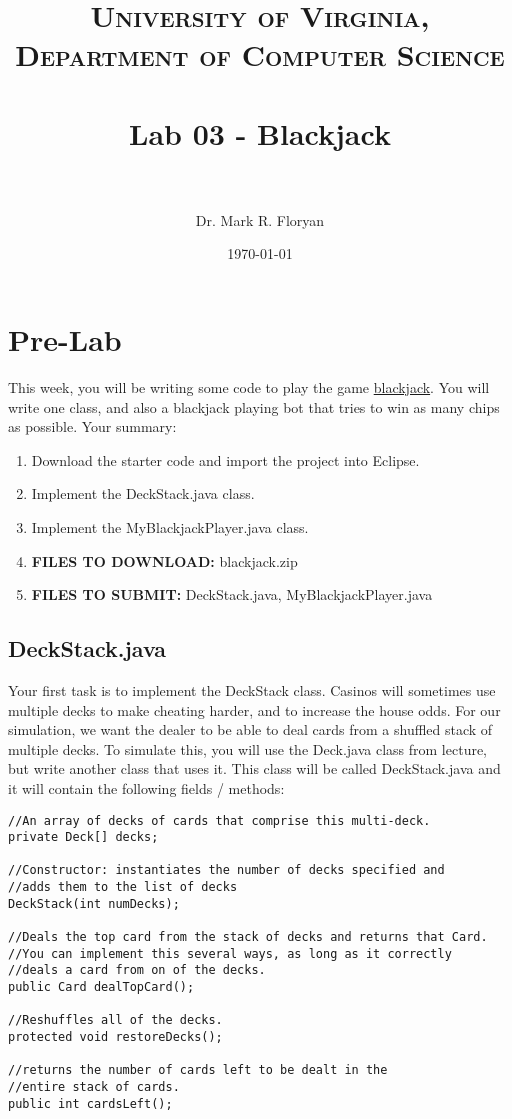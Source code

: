 \documentclass[paper=a4, fontsize=11pt, parskip=full]{scrartcl} %
\title{	
\normalfont \normalsize 
\textsc{University of Virginia, Department of Computer Science} \\ [25pt] %
\horrule{0.5pt} \\[0.4cm] %
\huge Lab 03 - Blackjack \\ %
\horrule{2pt} \\[0.5cm] %
}
\author{Dr. Mark R. Floryan} %
\date{\normalsize\today} %
\numberwithin{equation}{section} %
\numberwithin{figure}{section} %
\numberwithin{table}{section} %
\begin{document}
\maketitle %


\section{Pre-Lab}

This week, you will be writing some code to play the game \href{https://en.wikipedia.org/wiki/Blackjack}{blackjack}. You will write one class, and also a blackjack playing bot that tries to win as many chips as possible. Your summary:

\begin{enumerate}
	\item Download the starter code and import the project into Eclipse.
	\item Implement the DeckStack.java class.
	\item Implement the MyBlackjackPlayer.java class.
	\item \textbf{FILES TO DOWNLOAD:} blackjack.zip
	\item \textbf{FILES TO SUBMIT:} DeckStack.java, MyBlackjackPlayer.java
\end{enumerate}


\subsection{DeckStack.java}

Your first task is to implement the DeckStack class. Casinos will sometimes use multiple decks to make cheating harder, and to increase the house odds. For our simulation, we want the dealer to be able to deal cards from a shuffled stack of multiple decks. To simulate this, you will use the Deck.java class from lecture, but write another class that uses it. This class will be called DeckStack.java and it will contain the following fields / methods:

\begin{lstlisting}
//An array of decks of cards that comprise this multi-deck.
private Deck[] decks;

//Constructor: instantiates the number of decks specified and
//adds them to the list of decks
DeckStack(int numDecks);

//Deals the top card from the stack of decks and returns that Card.
//You can implement this several ways, as long as it correctly
//deals a card from on of the decks.
public Card dealTopCard();

//Reshuffles all of the decks.
protected void restoreDecks();

//returns the number of cards left to be dealt in the
//entire stack of cards.
public int cardsLeft();
\end{lstlisting}
\end{document}
